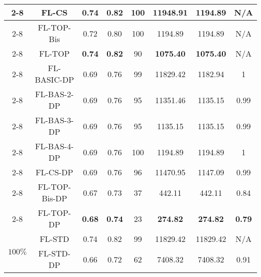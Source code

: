 \documentclass[accepted]{uai2021} %
\begin{document}
\begin{table*}[!ht]
{\begin{tabular}{|c|c|c|c|c|c|c|c|}
        \cline{2-8}
        &  FL-CS &  0.74  & 0.82 & 100 & 11948.91 & 1194.89 & N/A \\
        \cline{2-8}
        &  FL-TOP-Bis &  0.72  & 0.80 & 100 & 1194.89 & 1194.89 &N/A \\
        \cline{2-8}
        &  FL-TOP & \textbf{0.74}  & \textbf{0.82} & 90 & \textbf{1075.40} & \textbf{1075.40} &N/A \\
        \cline{2-8}
        &  FL-BASIC-DP  & 0.69 & 0.76 & 99 & 11829.42 & 1182.94 & 1 \\
        \cline{2-8}
        &  FL-BAS-2-DP  & 0.69 & 0.76 & 95 & 11351.46 & 1135.15 & 0.99\\
        \cline{2-8}
        &  FL-BAS-3-DP &  0.69  & 0.76 & 95 & 1135.15 & 1135.15 & 0.99\\
        \cline{2-8}
        &  FL-BAS-4-DP &  0.69  & 0.76 & 100 & 1194.89 & 1194.89 & 1\\
        \cline{2-8}
        &  FL-CS-DP &  0.69  & 0.76 & 96 & 11470.95 & 1147.09 & 0.99\\
        \cline{2-8}
        &  FL-TOP-Bis-DP &  0.67  & 0.73 & 37 & 442.11 & 442.11 & 0.84\\
        \cline{2-8}
        &  FL-TOP-DP &  \textbf{0.68}  & \textbf{0.74} & 23 & \textbf{274.82} & \textbf{274.82} & \textbf{0.79}\\
        \hline 
        \hline
        
        
        \multirow{2}{*}{$100\%$} &  FL-STD  & 0.74 & 0.82 & 99 & 11829.42 & 11829.42 &N/A \\
        \cline{2-8}
        &  FL-STD-DP   & 0.66 & 0.72 & 62 & 7408.32 & 7408.32 & 0.91 \\
        \hline
        
    \end{tabular}}
    \caption{Summary of results on Medical dataset (Part 2).}
    \label{tab:description_results_Medical_data_part_2}
\vspace{-.3cm}
\end{table*}
\end{document}
